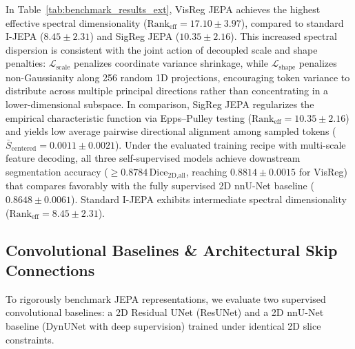 \documentclass{article}
\begin{document}
In Table~\ref{tab:benchmark_results_ext}, VisReg JEPA achieves the highest effective spectral dimensionality ($\text{Rank}_{\text{eff}} = \mathbf{17.10 \pm 3.97}$), compared to standard I-JEPA ($8.45 \pm 2.31$) and SigReg JEPA ($10.35 \pm 2.16$). This increased spectral dispersion is consistent with the joint action of decoupled scale and shape penalties: $\mathcal{L}_{\text{scale}}$ penalizes coordinate variance shrinkage, while $\mathcal{L}_{\text{shape}}$ penalizes non-Gaussianity along 256 random 1D projections, encouraging token variance to distribute across multiple principal directions rather than concentrating in a lower-dimensional subspace. In comparison, SigReg JEPA regularizes the empirical characteristic function via Epps--Pulley testing ($\text{Rank}_{\text{eff}} = 10.35 \pm 2.16$) and yields low average pairwise directional alignment among sampled tokens ($\bar{S}_{\text{centered}} = \mathbf{0.0011 \pm 0.0021}$). Under the evaluated training recipe with multi-scale feature decoding, all three self-supervised models achieve downstream segmentation accuracy ($\ge 0.8784\,\text{Dice}_{\text{2D,all}}$, reaching $\mathbf{0.8814 \pm 0.0015}$ for VisReg) that compares favorably with the fully supervised 2D nnU-Net baseline ($0.8648 \pm 0.0061$). Standard I-JEPA exhibits intermediate spectral dimensionality ($\text{Rank}_{\text{eff}} = 8.45 \pm 2.31$).

\subsection{Convolutional Baselines \& Architectural Skip Connections}

To rigorously benchmark JEPA representations, we evaluate two supervised convolutional baselines: a 2D Residual UNet (ResUNet) and a 2D nnU-Net baseline (DynUNet with deep supervision) trained under identical 2D slice constraints.
\end{document}
